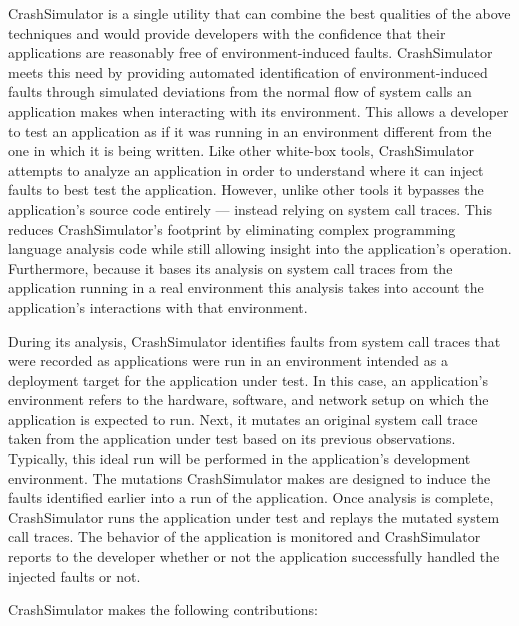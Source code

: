     CrashSimulator is a single utility that can combine the best qualities of the above techniques and would provide
    developers with the confidence that their applications are reasonably free of environment-induced faults.
    CrashSimulator meets this need by providing automated identification of environment-induced faults through simulated
    deviations from the normal flow of system calls an application makes when interacting with its environment. This
    allows a developer to test an application as if it was running in an environment different from the one in which it
    is being written. Like other white-box tools, CrashSimulator attempts to analyze an application in order to
    understand where it can inject faults to best test the application. However, unlike other tools it bypasses the
    application's source code entirely --- instead relying on system call traces. This reduces CrashSimulator's
    footprint by eliminating complex programming language analysis code while still allowing insight into the
    application's operation. Furthermore, because it bases its analysis on system call traces from the application
    running in a real environment this analysis takes into account the application's interactions with that environment.

    During its analysis, CrashSimulator identifies faults from system call traces that were recorded as applications
    were run in an environment intended as a deployment target for the application under test. In this case, an
    application's environment refers to the hardware, software, and network setup on which the application is expected
    to run. Next, it mutates an original system call trace taken from the application under test based on its previous
    observations. Typically, this ideal run will be performed in the application's development environment. The
    mutations CrashSimulator makes are designed to induce the faults identified earlier into a run of the application.
    Once analysis is complete, CrashSimulator runs the application under test and replays the mutated system call
    traces. The behavior of the application is monitored and CrashSimulator reports to the developer whether or not the
    application successfully handled the injected faults or not.

    CrashSimulator makes the following contributions:

